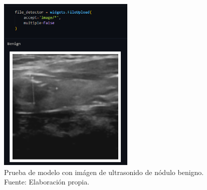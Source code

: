 \begin{figure}[H]
	\begin{center}
		\includegraphics[width=0.58\textwidth]{4/figures/simulacion_modelo_benign.PNG}
		\caption[Prueba de modelo con imágen de ultrasonido de nódulo benigno]{Prueba de modelo con imágen de ultrasonido de nódulo benigno. \\
		Fuente: Elaboración propia.}
		\label{4:fig171}
	\end{center}
\end{figure}
